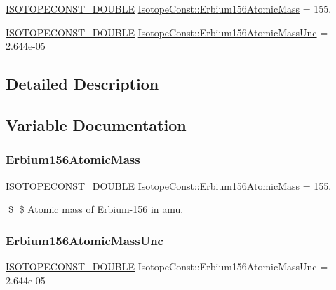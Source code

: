 \begin{DoxyCompactItemize}
\item 
\mbox{\hyperlink{group___isotope_const-_macros_ga8f45a7272ce02c0b4c65c44636ed719a}{I\+S\+O\+T\+O\+P\+E\+C\+O\+N\+S\+T\+\_\+\+D\+O\+U\+B\+LE}} \mbox{\hyperlink{group___isotope_const-_erbium-_er156_gabe64d92ec9cb79c2e795936176ca8313}{Isotope\+Const\+::\+Erbium156\+Atomic\+Mass}} = 155.
\item 
\mbox{\hyperlink{group___isotope_const-_macros_ga8f45a7272ce02c0b4c65c44636ed719a}{I\+S\+O\+T\+O\+P\+E\+C\+O\+N\+S\+T\+\_\+\+D\+O\+U\+B\+LE}} \mbox{\hyperlink{group___isotope_const-_erbium-_er156_gadeff01ce9cc1639dd8ba6815bc7cce30}{Isotope\+Const\+::\+Erbium156\+Atomic\+Mass\+Unc}} = 2.\+644e-\/05
\end{DoxyCompactItemize}


\subsection{Detailed Description}


\subsection{Variable Documentation}
\mbox{\label{group___isotope_const-_erbium-_er156_gabe64d92ec9cb79c2e795936176ca8313}} 
\subsubsection{\texorpdfstring{Erbium156\+Atomic\+Mass}{Erbium156AtomicMass}}
{\footnotesize\ttfamily \mbox{\hyperlink{group___isotope_const-_macros_ga8f45a7272ce02c0b4c65c44636ed719a}{I\+S\+O\+T\+O\+P\+E\+C\+O\+N\+S\+T\+\_\+\+D\+O\+U\+B\+LE}} Isotope\+Const\+::\+Erbium156\+Atomic\+Mass = 155.}

\$ \$ Atomic mass of Erbium-\/156 in amu. \mbox{\label{group___isotope_const-_erbium-_er156_gadeff01ce9cc1639dd8ba6815bc7cce30}} 
\subsubsection{\texorpdfstring{Erbium156\+Atomic\+Mass\+Unc}{Erbium156AtomicMassUnc}}
{\footnotesize\ttfamily \mbox{\hyperlink{group___isotope_const-_macros_ga8f45a7272ce02c0b4c65c44636ed719a}{I\+S\+O\+T\+O\+P\+E\+C\+O\+N\+S\+T\+\_\+\+D\+O\+U\+B\+LE}} Isotope\+Const\+::\+Erbium156\+Atomic\+Mass\+Unc = 2.\+644e-\/05}

